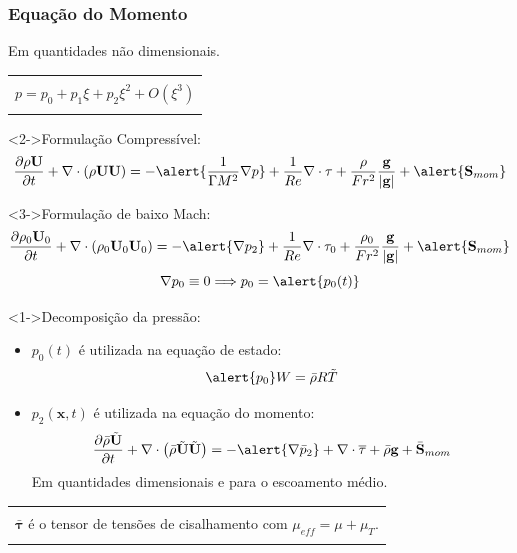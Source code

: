 \documentclass[bars,mathserif]{beamer}
\newcommand{\bv}[1]{\mathbf{#1}}
\begin{document}
\begin{frame}
\frametitle{Equação do Momento}
Em quantidades não dimensionais. 
%
\hspace{10pt}
\footnotesize
\centering
\begin{tabular}{|l|}
\hline \\
$p = p_{0} + p_{1}\xi + p_{2}\xi^2 + O\left( \xi^3 \right)$ \\ \\
\hline
\end{tabular}
%
\pause
\begin{block}<2->{Formulação Compressível:}
\begin{equation*}
 \frac{\partial \rho \bv{U} }{\partial t} + \nabla \cdot \left( \rho \bv{U}
\bv{U} \right) = -\alert{\frac{1}{\Gamma M^2} \nabla p} + \frac{1}{Re} \nabla \cdot
\bv{\tau} +\frac{\rho}{Fr^2} \frac{\bv{g}}{|\bv{g}|}+\alert{\bv{S}_{mom}}
\end{equation*}
\end{block}

\begin{block}<3->{Formulação de baixo Mach:}
\begin{equation*}
 \frac{\partial \rho_0 \bv{U}_0 }{\partial t} + \nabla \cdot \left( \rho_0
\bv{U}_0 \bv{U}_0 \right) = -\alert{\nabla p_2} + \frac{1}{Re} \nabla \cdot \bv{\tau}_0
+\frac{\rho_0}{Fr^2} \frac{\bv{g}}{|\bv{g}|}+\alert{\bv{S}_{mom}}
\end{equation*}
\begin{equation*}
\nabla p_0 \equiv 0 \Longrightarrow p_0 = \alert{p_0 (t)}
\end{equation*}
\end{block}
%
\end{frame}
%
\begin{frame}
\begin{block}<1->{Decomposição da pressão:}
\begin{itemize}
 \item<2-> $p_0 (t)$ é utilizada na equação de estado: 
\begin{equation*}
\alert{p_0} W = \bar{\rho} R \tilde{T}
\end{equation*}
 \item<3-> $p_2 (\bv{x},t)$ é utilizada na equação do momento:
 \begin{equation*}
  \frac{\partial \bar{\rho} \tilde{\bv{U}} }{\partial t} + \nabla \cdot \left(
\bar{\rho} \tilde{\bv{U}} \tilde{\bv{U}} \right) = -\alert{\nabla \bar{p}_2} +  
 \nabla \cdot\overline{\bv{\tau}} +\bar{\rho}\bv{g}+\bar{\bv{S}}_{mom}
 \end{equation*}
Em quantidades dimensionais e para o escoamento médio.
\end{itemize}
\end{block}
%
\footnotesize
\begin{tabular}{|l|}
\hline \\
$\bar{\bv{\tau}}$ é o tensor de tensões de cisalhamento com $\mu_{eff}=\mu+\mu_T$.\\ \\
\hline 
\end{tabular}
%
\end{frame}
\end{document}
